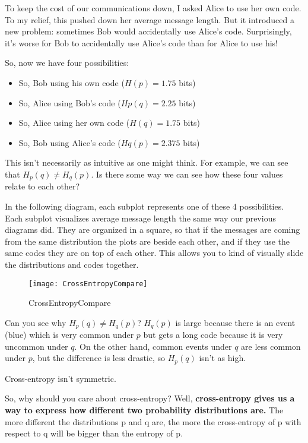 To keep the cost of our communications down, I asked Alice to use her own code. To my relief, this pushed down her average message length.
But it introduced a new problem: sometimes Bob would accidentally use Alice's code.
Surprisingly, it's worse for Bob to accidentally use Alice's code than for Alice to use his!

So, now we have four possibilities:
\begin{itemize}
\item So, Bob using his own code ($H(p)=1.75$ bits)
\item So, Alice using Bob's code ($Hp(q)=2.25$ bits)
\item So, Alice using her own code ($H(q)=1.75$ bits)
\item So, Bob using Alice's code ($Hq(p)=2.375$ bits)
\end{itemize}

This isn't necessarily as intuitive as one might think. For example, we can see that $H_p(q) \neq H_q(p)$.
Is there some way we can see how these four values relate to each other?

In the following diagram, each subplot represents one of these 4 possibilities.
Each subplot visualizes average message length the same way our previous diagrams did.
They are organized in a square, so that if the messages are coming from the same distribution the plots are beside each other,
and if they use the same codes they are on top of each other. This allows you to kind of visually slide the distributions and codes together.

\begin{figure}[htbp]
  \centering
  \texttt{[image: CrossEntropyCompare]}\\
  \caption{CrossEntropyCompare}\label{fig.entropy.CrossEntropyCompare}
\end{figure}

Can you see why $H_p(q) \neq H_q(p)$?
$H_q(p)$ is large because there is an event (blue) which is very common under $p$ but gets a long code because it is very uncommon under $q$.
On the other hand, common events under $q$ are less common under $p$, but the difference is less drastic, so $H_p(q)$ isn't as high.

Cross-entropy isn't symmetric.

So, why should you care about cross-entropy? Well, \textbf{cross-entropy gives us a way to express how different two probability distributions are.}
The more different the distributions p and q are, the more the cross-entropy of p with respect to q will be bigger than the entropy of p.

